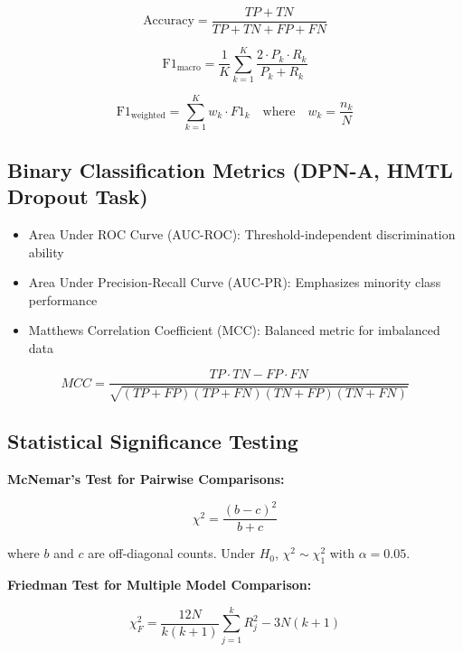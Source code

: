 \begin{equation}
\text{Accuracy} = \frac{TP + TN}{TP + TN + FP + FN}
\end{equation}

\begin{equation}
\text{F1}_{\text{macro}} = \frac{1}{K} \sum_{k=1}^{K} \frac{2 \cdot P_k \cdot R_k}{P_k + R_k}
\end{equation}

\begin{equation}
\text{F1}_{\text{weighted}} = \sum_{k=1}^{K} w_k \cdot F1_k \quad \text{where} \quad w_k = \frac{n_k}{N}
\end{equation}

\subsection{Binary Classification Metrics (DPN-A, HMTL Dropout Task)}

\begin{itemize}
\item Area Under ROC Curve (AUC-ROC): Threshold-independent discrimination ability
\item Area Under Precision-Recall Curve (AUC-PR): Emphasizes minority class performance
\item Matthews Correlation Coefficient (MCC): Balanced metric for imbalanced data
\end{itemize}

\begin{equation}
MCC = \frac{TP \cdot TN - FP \cdot FN}{\sqrt{(TP+FP)(TP+FN)(TN+FP)(TN+FN)}}
\end{equation}

\subsection{Statistical Significance Testing}

\textbf{McNemar's Test for Pairwise Comparisons:}

\begin{equation}
\chi^2 = \frac{(b - c)^2}{b + c}
\end{equation}

where $b$ and $c$ are off-diagonal counts. Under $H_0$, $\chi^2 \sim \chi^2_1$ with $\alpha = 0.05$.

\textbf{Friedman Test for Multiple Model Comparison:}

\begin{equation}
\chi^2_F = \frac{12N}{k(k+1)} \sum_{j=1}^{k} R_j^2 - 3N(k+1)
\end{equation}

